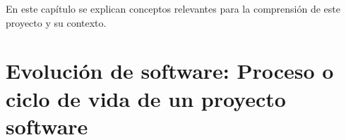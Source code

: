 \begin{comment}
%
%
%
%
%
\end{comment}

En este capítulo se explican conceptos relevantes para la comprensión de este proyecto y su contexto.

\section{Evolución de software: Proceso o ciclo de vida de un proyecto software}


